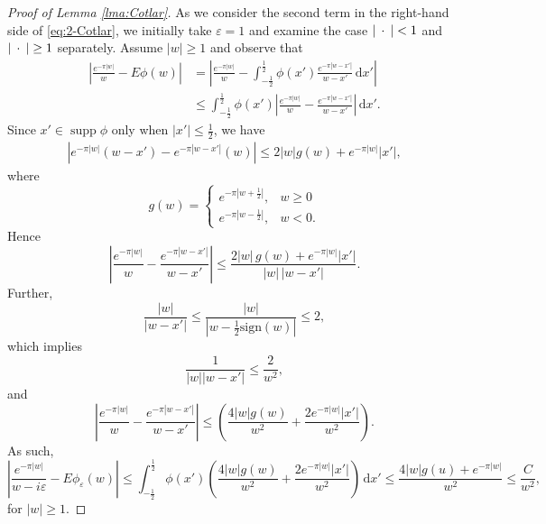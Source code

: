 \documentclass[../dissertation.tex]{subfiles}
\begin{document}
\begin{proof}[Proof of Lemma \ref{lma:Cotlar}]
    As we consider the second term in the right-hand side of \eqref{eq:2-Cotlar}, we initially 
    take $\varepsilon = 1$ and examine the case $|\kern 0.5ex \cdot \kern 0.5ex| <1$ and $|\kern 0.5ex \cdot \kern 0.5ex| \geq 1$ separately. 
    Assume $|w| \geq 1$ and observe that
    \begin{align*}
        \left| 
        	 \frac{e^{-\pi | w |}}{ w }  - E\phi(w)
        \right|
            &= 
            	\left| 
            		\frac{e^{-\pi | w |}}{ w }
             		   - \int_{-\frac{1}{2}}^{\frac{1}{2}} \phi(x')\frac{e^{-\pi|w-x'|}}{w-x'} \, \mathrm{d}x' 
             	\right| \\
            &\leq 
            	\int_{-\frac{1}{2}}^{\frac{1}{2}} \phi(x') 
	                \left| 
	                	\frac{e^{-\pi | w |}}{ w }
	                		- \frac{e^{-\pi|w-x'|}}{w-x'} 
	                \right| 
                \, \mathrm{d}x'.
    \end{align*}
    Since $x' \in \mathop{\text{supp}} \phi$ only when $|x'| \leq \frac{1}{2}$, we have
    \begin{align*}
        \left| e^{-\pi|w|} (w - x') - e^{-\pi|w-x'|}(w) \right|
            \leq 2 |w| g(w) + e^{-\pi |w|} |x'|,
    \end{align*}
    where
    \[
        g(w)
            = \begin{cases}
                e^{-\pi \left|w + \frac{1}{2}\right|}, & w \geq 0 \\
                e^{-\pi \left|w - \frac{1}{2}\right|}, & w < 0.
            \end{cases}
    \]
    Hence
    \[
        \left| \frac{e^{-\pi|w|}}{w} - \frac{e^{-\pi|w-x'|}}{w-x'} \right|
            \leq \frac{2|w|\, g(w) + e^{-\pi |w|}|x'|}{|w| \, |w - x'|}.
    \]
    Further,
    \[
        \frac{|w|}{|w - x'|}
            \leq \frac{|w|}{\left|w - \frac{1}{2}\text{sign}(w)\right|}
            \leq 2,
    \]
    which implies 
    \[
        \frac{1}{|w||w-x'|}
            \leq \frac{2}{w^2},
    \]
    and
    \[
        \left| \frac{e^{-\pi|w|}}{w} - \frac{e^{-\pi|w-x'|}}{w-x'} \right|
            \leq 
            	\left( 
            		\frac{4|w| g(w)}{w^2} + \frac{2 e^{-\pi|w|} |x'|}{w^2} 
            	\right).
    \]
    As such,
    \[
        \left| \frac{e^{-\pi|w|}}{w - i \varepsilon} - E\phi_\varepsilon(w) \right|
        	\leq 
        		\int_{-\frac{1}{2}}^{\frac{1}{2}} 
        			\phi(x') 
        			\left(
        				\frac{4|w|g(w)}{w^2} + \frac{2 e^{-\pi|w|} |x'|}{w^2}
        			\right)
        		\, \mathrm{d}x'
            \leq \frac{4|w|g(u) + e^{-\pi|w|}}{w^2}
            \leq \frac{C}{w^2},
    \]
    for $|w| \geq 1$.


\end{proof}
\end{document}
